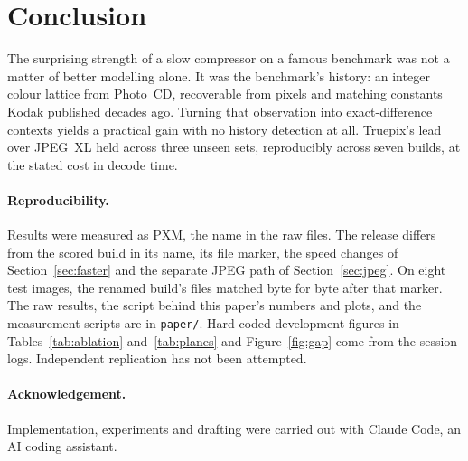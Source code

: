 \documentclass[10pt,twocolumn]{article}
\begin{document}
\section{Conclusion}

The surprising strength of a slow compressor on a famous benchmark was not a matter of better modelling alone. It was the benchmark's history: an integer colour lattice from Photo~CD, recoverable from pixels and matching constants Kodak published decades ago. Turning that observation into exact-difference contexts yields a practical gain with no history detection at all. Truepix's lead over JPEG~XL held across three unseen sets, reproducibly across seven builds, at the stated cost in decode time.

\paragraph{Reproducibility.}
Results were measured as PXM, the name in the raw files. The release differs from the scored build in its name, its file marker, the speed changes of Section~\ref{sec:faster} and the separate JPEG path of Section~\ref{sec:jpeg}. On eight test images, the renamed build's files matched byte for byte after that marker. The raw results, the script behind this paper's numbers and plots, and the measurement scripts are in \texttt{paper/}. Hard-coded development figures in Tables~\ref{tab:ablation} and~\ref{tab:planes} and Figure~\ref{fig:gap} come from the session logs. Independent replication has not been attempted.

\paragraph{Acknowledgement.}
Implementation, experiments and drafting were carried out with Claude Code, an AI coding assistant.
\end{document}
